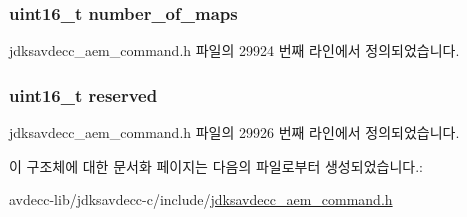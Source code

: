 \subsubsection[{\texorpdfstring{number\+\_\+of\+\_\+maps}{number_of_maps}}]{\setlength{\rightskip}{0pt plus 5cm}uint16\+\_\+t number\+\_\+of\+\_\+maps}\hypertarget{structjdksavdecc__aem__command__get__video__map__response_a6d00316ed943197ab46c0af22c1d430a}{}\label{structjdksavdecc__aem__command__get__video__map__response_a6d00316ed943197ab46c0af22c1d430a}


jdksavdecc\+\_\+aem\+\_\+command.\+h 파일의 29924 번째 라인에서 정의되었습니다.

\subsubsection[{\texorpdfstring{reserved}{reserved}}]{\setlength{\rightskip}{0pt plus 5cm}uint16\+\_\+t reserved}\hypertarget{structjdksavdecc__aem__command__get__video__map__response_a5a6ed8c04a3db86066924b1a1bf4dad3}{}\label{structjdksavdecc__aem__command__get__video__map__response_a5a6ed8c04a3db86066924b1a1bf4dad3}


jdksavdecc\+\_\+aem\+\_\+command.\+h 파일의 29926 번째 라인에서 정의되었습니다.



이 구조체에 대한 문서화 페이지는 다음의 파일로부터 생성되었습니다.\+:\begin{DoxyCompactItemize}
\item 
avdecc-\/lib/jdksavdecc-\/c/include/\hyperlink{jdksavdecc__aem__command_8h}{jdksavdecc\+\_\+aem\+\_\+command.\+h}\end{DoxyCompactItemize}
